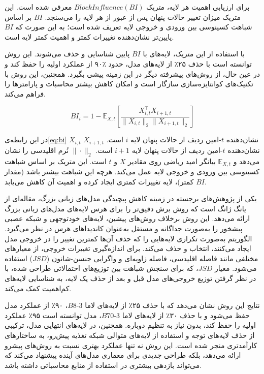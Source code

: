 برای ارزیابی اهمیت هر لایه، متریک $Block Influence (BI)$ معرفی شده است. این متریک میزان تغییر حالات پنهان پس از عبور از هر لایه را می‌سنجد. $BI$ بر اساس شباهت کسینوسی بین ورودی و خروجی لایه تعریف شده است؛ به این صورت که $BI$ پایین‌تر نشان‌دهنده تغییرات کمتر و اهمیت کمتر لایه است.

با استفاده از این متریک، لایه‌های با $BI$ پایین شناسایی و حذف می‌شوند. این روش توانسته است با حذف ۲۵٪ از لایه‌های مدل، حدود ٪۹۰ از عملکرد اولیه را حفظ کند و در عین حال، از روش‌های پیشرفته دیگر در این زمینه پیشی بگیرد. همچنین، این روش با تکنیک‌های کوانتایزه‌سازی سازگار است و امکان کاهش بیشتر محاسبات و پارامترها را فراهم می‌کند.

\begin{equation}
	BI_i = 1 - \mathbb{E}_{X, t} \left[ \frac{X_{i,t}^\top X_{i+1,t}}{\|X_{i,t}\|_2 \|X_{i+1,t}\|_2} \right]
	\label{eq:bi}
\end{equation}

در این رابطه‌ی\ref{eq:bi} \( X_{i,t} \) نشان‌دهنده \( t \)-امین ردیف از حالات پنهان لایه \( i \) است. \( X_{i+1,t} \) نشان‌دهنده \( t \)-امین ردیف از حالات پنهان لایه \( i+1 \) است. \( \|\cdot\|_2 \) نُرم اقلیدسی را نشان می‌دهد و \( \mathbb{E}_{X, t} \) بیانگر امید ریاضی روی مقادیر \( X \) و \( t \) است. این متریک بر اساس شباهت کسینوسی بین ورودی و خروجی لایه عمل می‌کند. هرچه این شباهت بیشتر باشد (مقدار \( BI \) کمتر)، لایه تغییرات کمتری ایجاد کرده و اهمیت آن کاهش می‌یابد.


یکی از پژوهش‌های برجسته در زمینه کاهش پیچیدگی مدل‌های زبانی بزرگ، مقاله‌ای از یانگ ژانگ است که روش برش دقیق‌تر  را برای هرس لایه‌های مدل‌های زبانی بزرگ ارائه می‌دهد. این روش برخلاف روش‌های پیشین، لایه‌های خودتوجهی و شبکه عصبی پیشخور را به‌صورت جداگانه و مستقل به‌عنوان کاندیداهای هرس در نظر می‌گیرد. الگوریتم به‌صورت تکراری لایه‌هایی را که حذف آن‌ها کمترین تغییر را در خروجی مدل ایجاد می‌کنند، انتخاب و حذف می‌کند. برای اندازه‌گیری تغییرات خروجی، از معیارهای مختلفی مانند فاصله اقلیدسی، فاصله زاویه‌ای و واگرایی جنسن-شانون ($JSD$) استفاده می‌شود. معیار $JSD$، که برای سنجش شباهت بین توزیع‌های احتمالاتی طراحی شده، با در نظر گرفتن توزیع خروجی‌های مدل قبل و بعد از حذف یک لایه، به شناسایی لایه‌های کم‌اهمیت کمک می‌کند.

نتایج این روش نشان می‌دهد که با حذف ۲۵٪ از لایه‌های لاما 3-8$B$، ۹۰٪ از عملکرد مدل حفظ می‌شود و با حذف ۳۰٪ از لایه‌های لاما 3-70$B$، مدل توانسته است ۹۵٪ عملکرد اولیه را حفظ کند، بدون نیاز به تنظیم دوباره. همچنین، در لایه‌های انتهایی مدل، ترکیبی از حذف لایه‌های توجه و استفاده از لایه‌های متوالی شبکه تغذیه پیش‌رو، به ساختارهای کارآمدتری منجر شده است. این روش نه تنها عملکرد بهتری نسبت به روش‌های پیشرو ارائه می‌دهد، بلکه طراحی جدیدی برای معماری مدل‌های آینده پیشنهاد می‌کند که می‌تواند بازدهی بیشتری در استفاده از منابع محاسباتی داشته باشد\cite{zhang2024finercut}.




